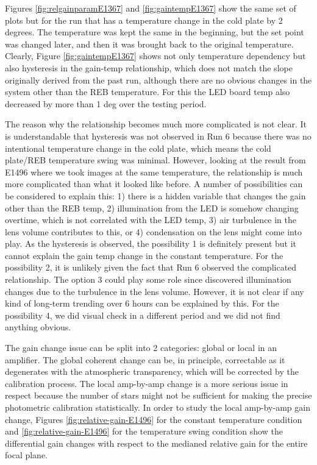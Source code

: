 Figures \ref{fig:relgainparamE1367} and \ref{fig:gaintempE1367} show the same set of plots but for the run that has a temperature change in the cold plate by 2 degrees.
The temperature was kept the same in the beginning, but the set point was changed later, and then it was brought back to the original temperature. 
Clearly, Figure \ref{fig:gaintempE1367} shows not only temperature dependency but also hysteresis in the gain-temp relationship, which does not match the slope originally derived from the past run, although there are no obvious changes in the system other than the REB temperature.
For this the LED board temp also decreased by more than 1 deg over the testing period.


The reason why the relationship becomes much more complicated is not clear. It is understandable that hysteresis was not observed in Run 6 because there was no intentional temperature change in the cold plate, which means the cold plate/REB temperature swing was minimal. However, looking at the result from E1496 where we took images at the same temperature, the relationship is much more complicated than what it looked like before. A number of possibilities can be considered to explain this: 1) there is a hidden variable that changes the gain other than the REB temp, 2) illumination from the LED is somehow changing overtime, which is not correlated with the LED temp, 3) air turbulence in the lens volume contributes to this, or 4) condensation on the lens might come into play. As the hysteresis is observed, the possibility 1 is definitely present but it cannot explain the gain temp change in the constant temperature. For the possibility 2, it is unlikely given the fact that Run 6 observed the complicated relationship. The option 3 could play some role since \citet{2024arXiv241113386B} discovered illumination changes due to the turbulence in the lens volume. However, it is not clear if any kind of long-term trending over 6 hours can be explained by this. For the possibility 4, we did visual check in a different period and we did not find anything obvious. 

The gain change issue can be split into 2 categories: global or local in an amplifier.  The global coherent change can be, in principle, correctable as it degenerates with the atmospheric transparency, which will be corrected by the calibration process. The local amp-by-amp change is a more serious issue in respect because the number of stars might not be sufficient for making the precise photometric calibration statistically. In order to study the local amp-by-amp gain change, Figures \ref{fig:relative-gain-E1496} for the constant temperature condition and \ref{fig:relative-gain-E1496} for the temperature swing condition show the differential gain changes with respect to the medianed relative gain for the entire focal plane. %

